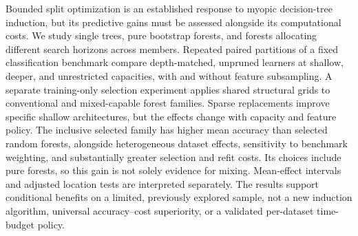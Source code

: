 Bounded split optimization is an established response to myopic decision-tree induction, but its predictive gains must be assessed alongside its computational costs. We study single trees, pure bootstrap forests, and forests allocating different search horizons across members. Repeated paired partitions of a fixed classification benchmark compare depth-matched, unpruned learners at shallow, deeper, and unrestricted capacities, with and without feature subsampling. A separate training-only selection experiment applies shared structural grids to conventional and mixed-capable forest families. Sparse replacements improve specific shallow architectures, but the effects change with capacity and feature policy. The inclusive selected family has higher mean accuracy than selected random forests, alongside heterogeneous dataset effects, sensitivity to benchmark weighting, and substantially greater selection and refit costs. Its choices include pure forests, so this gain is not solely evidence for mixing. Mean-effect intervals and adjusted location tests are interpreted separately. The results support conditional benefits on a limited, previously explored sample, not a new induction algorithm, universal accuracy--cost superiority, or a validated per-dataset time-budget policy.
